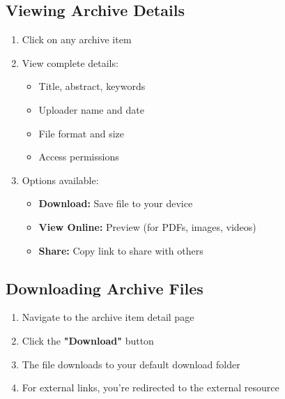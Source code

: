 \documentclass[12pt,a4paper]{article}
\begin{document}
\subsection{Viewing Archive Details}
\begin{enumerate}[leftmargin=*]
    \item Click on any archive item
    \item View complete details:
        \begin{itemize}
            \item Title, abstract, keywords
            \item Uploader name and date
            \item File format and size
            \item Access permissions
        \end{itemize}
    \item Options available:
        \begin{itemize}
            \item \textbf{Download:} Save file to your device
            \item \textbf{View Online:} Preview (for PDFs, images, videos)
            \item \textbf{Share:} Copy link to share with others
        \end{itemize}
\end{enumerate}

\subsection{Downloading Archive Files}
\begin{enumerate}[leftmargin=*]
    \item Navigate to the archive item detail page
    \item Click the \textbf{"Download"} button
    \item The file downloads to your default download folder
    \item For external links, you're redirected to the external resource
\end{enumerate}
\end{document}
